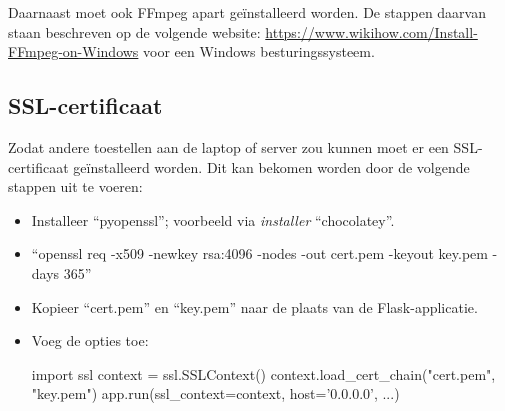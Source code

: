 Daarnaast moet ook FFmpeg apart geïnstalleerd worden. De stappen daarvan staan beschreven op de volgende website: \url{https://www.wikihow.com/Install-FFmpeg-on-Windows} voor een Windows besturingssysteem.

\subsection{SSL-certificaat}
Zodat andere toestellen aan de laptop of server zou kunnen moet er een SSL-certificaat geïnstalleerd worden. Dit kan bekomen worden door de volgende stappen uit te voeren:
\begin{itemize}
	\item Installeer ``pyopenssl''; voorbeeld via \textit{installer} ``chocolatey''.
	\item ``openssl req -x509 -newkey rsa:4096 -nodes -out cert.pem -keyout key.pem -days 365''
	\item Kopieer ``cert.pem'' en ``key.pem'' naar de plaats van de Flask-applicatie.
	\item Voeg de opties toe:
	\begin{python}
		import ssl
  		context = ssl.SSLContext()
		context.load_cert_chain("cert.pem", "key.pem")
		app.run(ssl_context=context, host='0.0.0.0', ...)
	\end{python}
\end{itemize}


